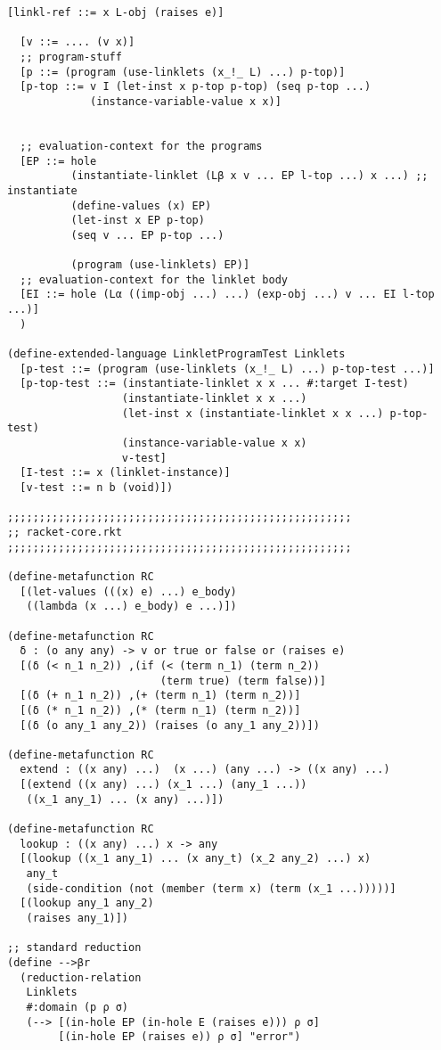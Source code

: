 \begin{lstlisting}[language=pltredex,
                basicstyle=\ttfamily\scriptsize,
                numbers=none, xleftmargin=2em]
  [linkl-ref ::= x L-obj (raises e)]

  [v ::= .... (v x)]
  ;; program-stuff
  [p ::= (program (use-linklets (x_!_ L) ...) p-top)]
  [p-top ::= v I (let-inst x p-top p-top) (seq p-top ...)
             (instance-variable-value x x)]


  ;; evaluation-context for the programs
  [EP ::= hole
          (instantiate-linklet (Lβ x v ... EP l-top ...) x ...) ;; instantiate
          (define-values (x) EP)
          (let-inst x EP p-top)
          (seq v ... EP p-top ...)

          (program (use-linklets) EP)]
  ;; evaluation-context for the linklet body
  [EI ::= hole (Lα ((imp-obj ...) ...) (exp-obj ...) v ... EI l-top ...)]
  )

(define-extended-language LinkletProgramTest Linklets
  [p-test ::= (program (use-linklets (x_!_ L) ...) p-top-test ...)]
  [p-top-test ::= (instantiate-linklet x x ... #:target I-test)
                  (instantiate-linklet x x ...)
                  (let-inst x (instantiate-linklet x x ...) p-top-test)
                  (instance-variable-value x x)
                  v-test]
  [I-test ::= x (linklet-instance)]
  [v-test ::= n b (void)])

;;;;;;;;;;;;;;;;;;;;;;;;;;;;;;;;;;;;;;;;;;;;;;;;;;;;;;
;; racket-core.rkt
;;;;;;;;;;;;;;;;;;;;;;;;;;;;;;;;;;;;;;;;;;;;;;;;;;;;;;

(define-metafunction RC
  [(let-values (((x) e) ...) e_body)
   ((lambda (x ...) e_body) e ...)])

(define-metafunction RC
  δ : (o any any) -> v or true or false or (raises e)
  [(δ (< n_1 n_2)) ,(if (< (term n_1) (term n_2))
                        (term true) (term false))]
  [(δ (+ n_1 n_2)) ,(+ (term n_1) (term n_2))]
  [(δ (* n_1 n_2)) ,(* (term n_1) (term n_2))]
  [(δ (o any_1 any_2)) (raises (o any_1 any_2))])

(define-metafunction RC
  extend : ((x any) ...)  (x ...) (any ...) -> ((x any) ...)
  [(extend ((x any) ...) (x_1 ...) (any_1 ...))
   ((x_1 any_1) ... (x any) ...)])

(define-metafunction RC
  lookup : ((x any) ...) x -> any
  [(lookup ((x_1 any_1) ... (x any_t) (x_2 any_2) ...) x)
   any_t
   (side-condition (not (member (term x) (term (x_1 ...)))))]
  [(lookup any_1 any_2)
   (raises any_1)])

;; standard reduction
(define -->βr
  (reduction-relation
   Linklets
   #:domain (p ρ σ)
   (--> [(in-hole EP (in-hole E (raises e))) ρ σ]
        [(in-hole EP (raises e)) ρ σ] "error")


\end{lstlisting}

